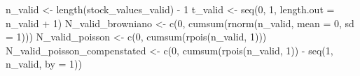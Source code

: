 \documentclass[
  letterpaper,
  DIV=11,
  numbers=noendperiod]{scrreprt}
\newenvironment{Shaded}{\begin{snugshade}}{\end{snugshade}}
\newcommand{\AttributeTok}[1]{\textcolor[rgb]{0.40,0.45,0.13}{#1}}
\newcommand{\DecValTok}[1]{\textcolor[rgb]{0.68,0.00,0.00}{#1}}
\newcommand{\FunctionTok}[1]{\textcolor[rgb]{0.28,0.35,0.67}{#1}}
\newcommand{\NormalTok}[1]{\textcolor[rgb]{0.00,0.23,0.31}{#1}}
\newcommand{\OtherTok}[1]{\textcolor[rgb]{0.00,0.23,0.31}{#1}}
\newcommand{\SpecialCharTok}[1]{\textcolor[rgb]{0.37,0.37,0.37}{#1}}
\begin{document}
\begin{Shaded}
\begin{Highlighting}[]
\NormalTok{n\_valid }\OtherTok{\textless{}{-}} \FunctionTok{length}\NormalTok{(stock\_values\_valid) }\SpecialCharTok{{-}} \DecValTok{1}
\NormalTok{t\_valid }\OtherTok{\textless{}{-}} \FunctionTok{seq}\NormalTok{(}\DecValTok{0}\NormalTok{, }\DecValTok{1}\NormalTok{, }\AttributeTok{length.out =}\NormalTok{ n\_valid }\SpecialCharTok{+} \DecValTok{1}\NormalTok{)}
\NormalTok{N\_valid\_browniano }\OtherTok{\textless{}{-}} \FunctionTok{c}\NormalTok{(}\DecValTok{0}\NormalTok{, }\FunctionTok{cumsum}\NormalTok{(}\FunctionTok{rnorm}\NormalTok{(n\_valid, }\AttributeTok{mean =} \DecValTok{0}\NormalTok{, }\AttributeTok{sd =} \DecValTok{1}\NormalTok{)))}
\NormalTok{N\_valid\_poisson }\OtherTok{\textless{}{-}} \FunctionTok{c}\NormalTok{(}\DecValTok{0}\NormalTok{, }\FunctionTok{cumsum}\NormalTok{(}\FunctionTok{rpois}\NormalTok{(n\_valid, }\DecValTok{1}\NormalTok{)))}
\NormalTok{N\_valid\_poisson\_compenstated }\OtherTok{\textless{}{-}} \FunctionTok{c}\NormalTok{(}\DecValTok{0}\NormalTok{, }\FunctionTok{cumsum}\NormalTok{(}\FunctionTok{rpois}\NormalTok{(n\_valid, }\DecValTok{1}\NormalTok{)) }\SpecialCharTok{{-}} \FunctionTok{seq}\NormalTok{(}\DecValTok{1}\NormalTok{, n\_valid, }\AttributeTok{by =} \DecValTok{1}\NormalTok{))}
\end{Highlighting}
\end{Shaded}
\end{document}
